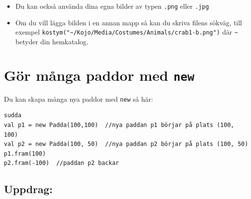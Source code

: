 \begin{itemize}

\item {Du kan också använda dina egna bilder av typen \lstinline{.png} eller \lstinline{.jpg}}
\item {Om du vill lägga bilden i en annan mapp så kan du skriva filens sökväg, till exempel \lstinline{kostym("~/Kojo/Media/Costumes/Animals/crab1-b.png")} där \lstinline{~} betyder din hemkatalog.}

\end{itemize}


\chapter{Gör många paddor med \lstinline{new}}Du kan skapa många nya paddor med \lstinline{new} så här:

\begin{lstlisting}[basicstyle={\ttfamily\fontsize{18}{22}\selectfont},numbers=none]
sudda
val p1 = new Padda(100,100)  //nya paddan p1 börjar på plats (100, 100)
val p2 = new Padda(100, 50)  //nya paddan p2 börjar på plats (100, 50)
p1.fram(100)
p2.fram(-100)  //paddan p2 backar
\end{lstlisting}
        

  
\section*{\color{BrickRed}Uppdrag:}


